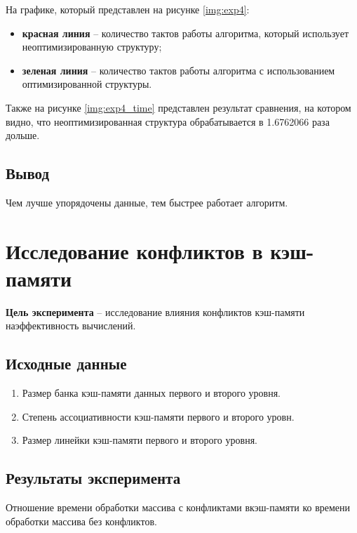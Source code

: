 На графике, который представлен на рисунке \ref{img:exp4}:
\begin{itemize}
	\item \textbf{красная линия} -- количество тактов работы алгоритма, который использует неоптимизированную структуру;
	\item \textbf{зеленая линия} -- количество тактов работы алгоритма с использованием оптимизированной структуры.
\end{itemize}


%


\clearpage


Также на рисунке \ref{img:exp4_time} представлен результат сравнения, на котором видно, что неоптимизированная структура обрабатывается в 1.6762066 раза дольше.


\subsection{Вывод}

Чем лучше упорядочены данные, тем быстрее работает алгоритм.




\section{Исследование конфликтов в кэш-памяти}

\textbf{Цель эксперимента} -- исследование   влияния   конфликтов   кэш-памяти   наэффективность вычислений.

\subsection{Исходные данные}
\begin{enumerate}
	\item Размер банка кэш-памяти данных первого и второго уровня.
	\item Степень ассоциативности кэш-памяти первого и второго уровн.
	\item Размер линейки кэш-памяти первого и второго уровня.
\end{enumerate}

\subsection{Результаты эксперимента}
Отношение времени обработки массива с конфликтами вкэш-памяти ко времени обработки массива без конфликтов.


